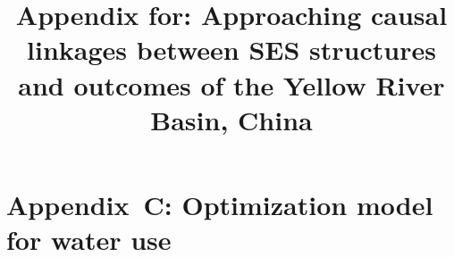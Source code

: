 \documentclass[default,sn-standardnature]{sn-jnl}
\begin{document}
\title{Appendix for: Approaching causal linkages between SES structures and outcomes of the Yellow River Basin, China}









\renewcommand{\figurename}{Supplementary Figure}
\renewcommand{\appendixname}{Appendix~\Alph{section}}
\setcounter{section}{0}

\newpage
\section*{Appendix~C: Optimization model for water use}\label{secS4}
\renewcommand{\thefigure}{C\arabic{figure}}
\renewcommand{\thetable}{C\arabic{table}}
\setcounter{figure}{0}
\setcounter{table}{0}


% 
% 
\end{document}
